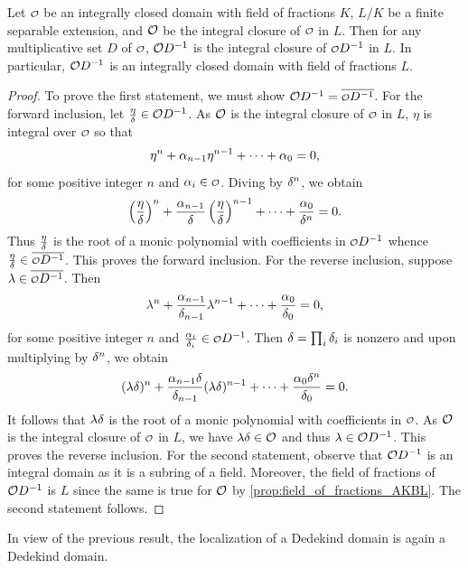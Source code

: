     \begin{proposition}\label{prop:localization_of_integral_closure_is_integral_closure}
      Let \(\smc{O}\) be an integrally closed domain with field of fractions \(K\), \(L/K\) be a finite separable extension, and \(\mathcal{O}\) be the integral closure of \(\smc{O}\) in \(L\). Then for any multiplicative set \(D\) of \(\smc{O}\), \(\mathcal{O}D^{-1}\) is the integral closure of \(\smc{O}D^{-1}\) in \(L\). In particular, \(\mathcal{O}D^{-1}\) is an integrally closed domain with field of fractions \(L\).
    \end{proposition}
    \begin{proof}
      To prove the first statement, we must show \(\mc{O}D^{-1} = \conj{\smc{O}D^{-1}}\). For the forward inclusion, let \(\frac{\eta}{\delta} \in \mathcal{O}D^{-1}\). As \(\mathcal{O}\) is the integral closure of \(\smc{O}\) in \(L\), \(\eta\) is integral over \(\smc{O}\) so that
      \[
        \eta^{n}+\alpha_{n-1}\eta^{n-1}+\cdots+\alpha_{0} = 0,
      \]
      for some positive integer \(n\) and \(\a_{i} \in \smc{O}\). Diving by \(\delta^{n}\), we obtain
      \[
        \left(\frac{\eta}{\delta}\right)^{n}+\frac{\alpha_{n-1}}{\delta}\left(\frac{\eta}{\delta}\right)^{n-1}+\cdots+\frac{\alpha_{0}}{\delta^{n}} = 0.
      \]
      Thus \(\frac{\eta}{\delta}\) is the root of a monic polynomial with coefficients in \(\smc{O}D^{-1}\) whence \(\frac{\eta}{\d} \in \conj{\smc{O}D^{-1}}\). This proves the forward inclusion. For the reverse inclusion, suppose \(\l \in \conj{\smc{O}D^{-1}}\). Then
      \[
        \lambda^{n}+\frac{\alpha_{n-1}}{\delta_{n-1}}\lambda^{n-1}+\cdots+\frac{\alpha_{0}}{\delta_{0}} = 0,
      \]
      for some positive integer \(n\) and \(\frac{\a_{i}}{\d_{i}} \in \smc{O}D^{-1}\). Then \(\delta = \prod_{i}\delta_{i}\) is nonzero and upon multiplying by \(\delta^{n}\), we obtain
      \[
        (\lambda\delta)^{n}+\frac{\alpha_{n-1}\delta}{\delta_{n-1}}(\lambda\delta)^{n-1}+\cdots+\frac{\alpha_{0}\delta^{n}}{\delta_{0}} = 0.
      \]
      It follows that \(\lambda\delta\) is the root of a monic polynomial with coefficients in \(\smc{O}\). As \(\mathcal{O}\) is the integral closure of \(\smc{O}\) in \(L\), we have \(\lambda\delta \in \mathcal{O}\) and thus \(\lambda \in \mathcal{O}D^{-1}\). This proves the reverse inclusion. For the second statement, observe that \(\mathcal{O}D^{-1}\) is an integral domain as it is a subring of a field. Moreover, the field of fractions of \(\mathcal{O}D^{-1}\) is \(L\) since the same is true for \(\mathcal{O}\) by \cref{prop:field_of_fractions_AKBL}. The second statement follows.
    \end{proof}

    In view of the previous result, the localization of a Dedekind domain is again a Dedekind domain.

